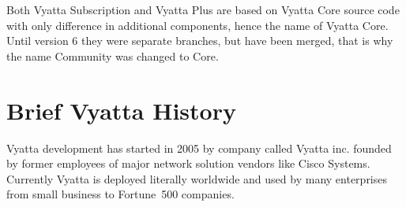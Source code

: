 Both Vyatta Subscription and Vyatta Plus are based on Vyatta Core source code with only difference in additional components, hence the name of Vyatta Core. Until version 6 they were separate branches, but have been merged, that is why the name Community was changed to Core.

\section{Brief Vyatta History}
Vyatta development has started in 2005 by company called Vyatta inc. founded by former employees of major network
solution vendors like Cisco Systems. Currently Vyatta is deployed literally worldwide and used by many enterprises 
from small business to Fortune~500 companies. 